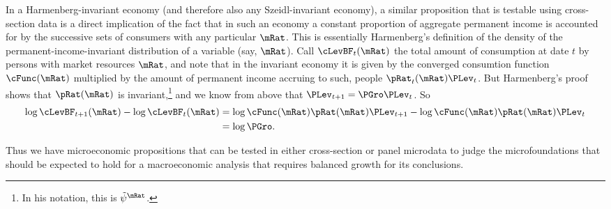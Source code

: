 \documentclass[ProjectDLO]{subfiles}
\begin{document}
In a Harmenberg-invariant economy (and therefore also any Szeidl-invariant economy), a similar proposition that is testable using cross-section data is a direct implication of the fact that in such an economy a constant proportion of aggregate permanent income is accounted for by the successive sets of consumers with any particular $\mRat$.  This is essentially Harmenberg's definition of the density of the permanent-income-invariant distribution of a variable (say, $\mRat$).  Call $\cLevBF_{t}(\mRat)$ the total amount of consumption at date $t$ by persons with market resources $\mRat$, and note that in the invariant economy it is given by the converged consumtion function $\cFunc(\mRat)$ multiplied by the amount of permanent income accruing to such, people $\pRat_{t}(\mRat)\PLev_{t}$.  But Harmenberg's proof shows that $\pRat(\mRat)$ is invariant,\footnote{In his notation, this is $\tilde{\psi}^{\mRat}$.} and we know from above that $\PLev_{t+1} = \PGro \PLev_{t}$.  So 
\begin{align}
  \log \cLevBF_{t+1}(\mRat) - \log \cLevBF_{t}(\mRat) &  \notag 
    = \log \cFunc(\mRat) \pRat(\mRat)\PLev_{t+1} - \log \cFunc(\mRat)\pRat(\mRat)\PLev_{t} \\
  & = \log \PGro .
\end{align}

Thus we have microeconomic propositions that can be tested in either cross-section or panel microdata to judge the microfoundations that should be expected to hold for a macroeconomic analysis that requires balanced growth for its conclusions.
\end{document}
